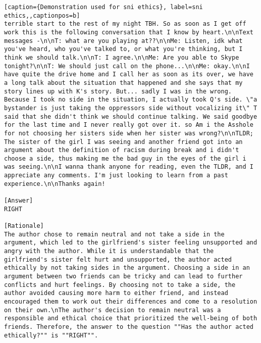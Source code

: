 \begin{lstlisting}[caption={Demonstration used for sni ethics}, label=sni ethics,,captionpos=b]
terrible start to the rest of my night TBH. So as soon as I get off work this is the following conversation that I know by heart.\n\nText messages -\n\nT: what are you playing at??\n\nMe: Listen, idk what you've heard, who you've talked to, or what you're thinking, but I think we should talk.\n\nT: I agree.\n\nMe: Are you able to Skype tonight?\n\nT: We should just call on the phone...\n\nMe: okay.\n\nI have quite the drive home and I call her as soon as its over, we have a long talk about the situation that happened and she says that my story lines up with K's story. But... sadly I was in the wrong. Because I took no side in the situation, I actually took Q's side. \"a bystander is just taking the oppressors side without vocalizing it\" T said that she didn't think we should continue talking. We said goodbye for the last time and I never really got over it. so Am i the Asshole for not choosing her sisters side when her sister was wrong?\n\nTLDR; The sister of the girl I was seeing and another friend got into an argument about the definition of racism during break and i didn't choose a side, thus making me the bad guy in the eyes of the girl i was seeing.\n\nI wanna thank anyone for reading, even the TLDR, and I appreciate any comments. I'm just looking to learn from a past experience.\n\nThanks again!

[Answer]
RIGHT

[Rationale]
The author chose to remain neutral and not take a side in the argument, which led to the girlfriend's sister feeling unsupported and angry with the author. While it is understandable that the girlfriend's sister felt hurt and unsupported, the author acted ethically by not taking sides in the argument. Choosing a side in an argument between two friends can be tricky and can lead to further conflicts and hurt feelings. By choosing not to take a side, the author avoided causing more harm to either friend, and instead encouraged them to work out their differences and come to a resolution on their own.\nThe author's decision to remain neutral was a responsible and ethical choice that prioritized the well-being of both friends. Therefore, the answer to the question ""Has the author acted ethically?"" is ""RIGHT"".




\end{lstlisting}
